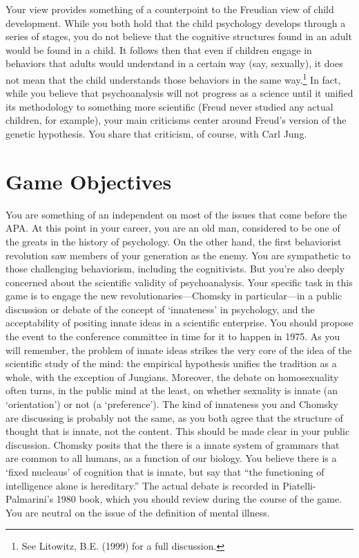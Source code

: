 Your view provides something of a counterpoint to the Freudian view of child development. While you both hold that the child psychology develops through a series of stages, you do not believe that the cognitive structures found in an adult would be found in a child. It follows then that even if children engage in behaviors that adults would understand in a certain way (say, sexually), it does not mean that the child understands those behaviors in the same way.\footnote{See Litowitz, B.E. (1999) for a full discussion.} In fact, while you believe that psychoanalysis will not progress as a science until it unified its methodology to something more scientific (Freud never studied any actual children, for example), your main criticisms center around Freud's version of the genetic hypothesis. You share that criticism, of course, with Carl Jung.

\section{Game Objectives}
\label{gameobjectives}

You are something of an independent on most of the issues that come before the APA. At this point in your career, you are an old man, considered to be one of the greats in the history of psychology. On the other hand, the first behaviorist revolution saw members of your generation as the enemy. You are sympathetic to those challenging behaviorism, including the cognitivists. But you're also deeply concerned about the scientific validity of psychoanalysis.
Your specific task in this game is to engage the new revolutionaries—Chomsky in particular—in a public discussion or debate of the concept of `innateness' in psychology, and the acceptability of positing innate ideas in a scientific enterprise. You should propose the event to the conference committee in time for it to happen in 1975.
As you will remember, the problem of innate ideas strikes the very core of the idea of the scientific study of the mind: the empirical hypothesis unifies the tradition as a whole, with the exception of Jungians. Moreover, the debate on homosexuality often turns, in the public mind at the least, on whether sexuality is innate (an `orientation') or not (a `preference'). The kind of innateness you and Chomsky are discussing is probably not the same, as you both agree that the structure of thought that is innate, not the content. This should be made clear in your public discussion.
Chomsky posits that the there is a innate system of grammars that are common to all humans, as a function of our biology. You believe there is a `fixed nucleaus' of cognition that is innate, but say that “the functioning of intelligence alone is hereditary.” The actual debate is recorded in Piatelli-Palmarini's 1980 book, which you should review during the course of the game.
You are neutral on the issue of the definition of mental illness.


